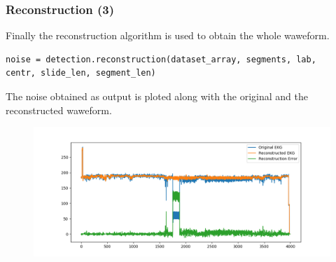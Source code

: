 \documentclass[xcolor ={table,usenames,dvipsnames}]{beamer}
\theoremstyle{definition}
\begin{document}
	\begin{frame}[fragile]
		\frametitle{Reconstruction (3)}
		Finally the reconstruction algorithm is used to obtain the whole waweform. 
		
		\begin{lstlisting}
noise = detection.reconstruction(dataset_array, segments, lab, 
centr, slide_len, segment_len)
		\end{lstlisting}
		The noise obtained as output is ploted along with the original and the reconstructed waweform.
		
		\begin{figure}[h!]
			\centering
			\includegraphics[scale=0.3]{img/noise.png}
		\end{figure}
	\end{frame}

	
	
\end{document}
